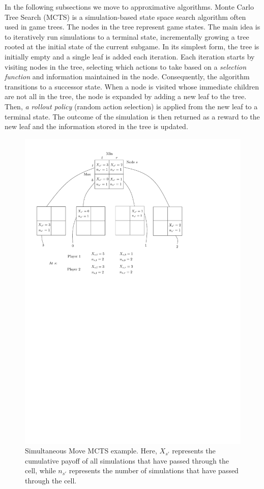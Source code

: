 In the following subsections we move to approximative algorithms.
Monte Carlo Tree Search (MCTS) is a simulation-based state space search algorithm often used
in game trees. The nodes in the tree represent game states. The main idea is to iteratively run
simulations to a terminal state, incrementally growing a tree rooted at the initial state of the current subgame. In
its simplest form, the tree is initially empty and a single leaf is added each iteration. Each iteration
starts by visiting nodes in the tree, selecting which actions to take based on a \emph{selection function} and
information maintained in the node. Consequently, the algorithm transitions to a successor state. When a
node is visited whose immediate children are not all in the tree, the node is expanded by adding a
new leaf to the tree. Then, \emph{a rollout policy} (\eg random action selection) is applied from the new
leaf to a terminal state. The outcome of the simulation is then returned as a reward to the new leaf
and the information stored in the tree is updated.

\begin{figure}[t]
\centering
\includegraphics[scale=0.7]{figures/smmcts-example}
\caption{Simultaneous Move MCTS example.
Here, $X_{s'}$ represents the cumulative payoff of all simulations that have passed
through the cell, while $n_{s'}$ represents the number of simulations that have passed through the cell.}
\label{fig:smmcts-example}
\end{figure}

